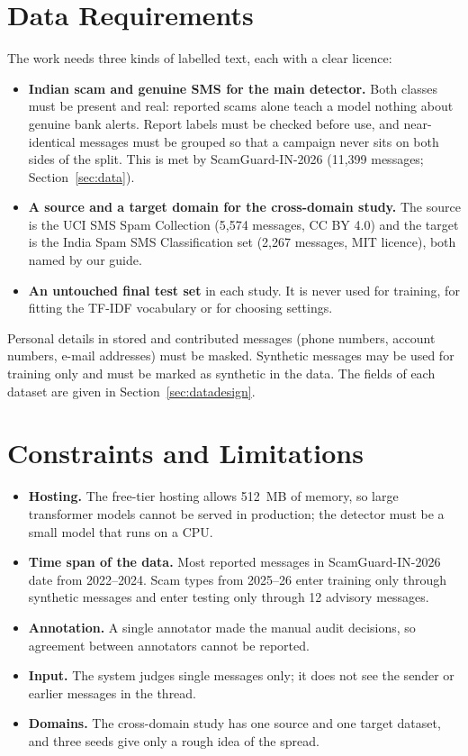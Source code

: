 \section{Data Requirements}
The work needs three kinds of labelled text, each with a clear licence:
\begin{itemize}
\item \textbf{Indian scam and genuine SMS for the main detector.} Both classes must be present and real: reported scams alone teach a model nothing about genuine bank alerts. Report labels must be checked before use, and near-identical messages must be grouped so that a campaign never sits on both sides of the split. This is met by ScamGuard-IN-2026 (11,399 messages; Section~\ref{sec:data}).
\item \textbf{A source and a target domain for the cross-domain study.} The source is the UCI SMS Spam Collection (5,574 messages, CC BY 4.0) and the target is the India Spam SMS Classification set (2,267 messages, MIT licence), both named by our guide.
\item \textbf{An untouched final test set} in each study. It is never used for training, for fitting the TF-IDF vocabulary or for choosing settings.
\end{itemize}
Personal details in stored and contributed messages (phone numbers, account numbers, e-mail addresses) must be masked. Synthetic messages may be used for training only and must be marked as synthetic in the data. The fields of each dataset are given in Section~\ref{sec:datadesign}.

\section{Constraints and Limitations}
\begin{itemize}
\item \textbf{Hosting.} The free-tier hosting allows 512~MB of memory, so large transformer models cannot be served in production; the detector must be a small model that runs on a CPU.
\item \textbf{Time span of the data.} Most reported messages in ScamGuard-IN-2026 date from 2022--2024. Scam types from 2025--26 enter training only through synthetic messages and enter testing only through 12 advisory messages.
\item \textbf{Annotation.} A single annotator made the manual audit decisions, so agreement between annotators cannot be reported.
\item \textbf{Input.} The system judges single messages only; it does not see the sender or earlier messages in the thread.
\item \textbf{Domains.} The cross-domain study has one source and one target dataset, and three seeds give only a rough idea of the spread.
\end{itemize}

